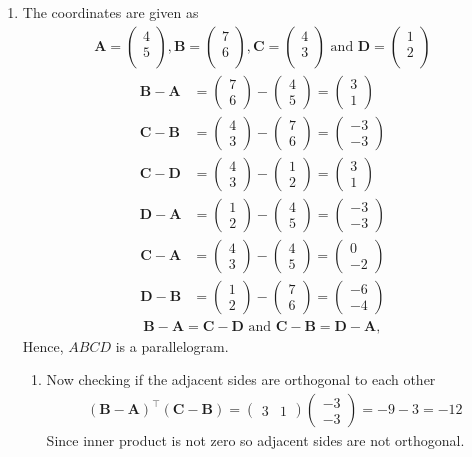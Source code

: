 \documentclass[12pt]{article}
\newcommand{\myvec}[1]{\ensuremath{\begin{pmatrix}#1\end{pmatrix}}}
\let\vec\mathbf
\begin{document}
\begin{enumerate}
\item The coordinates are given as
	\begin{align}
	\vec{A} = \myvec{
		4\\
		5\\
		},
	\vec{B} = \myvec{
		7\\
		6\\
		},
	\vec{C} = \myvec{
		4\\
		3\\
		} \text{ and }
	\vec{D} = \myvec{
		1\\
		2\\
		}
	\end{align}
	\begin{align}
		\vec{B} - \vec{A} &= \myvec{7\\6} - \myvec{4\\5} = \myvec{3\\1}\\
		\vec{C} - \vec{B} &= \myvec{4\\3} - \myvec{7\\6} = \myvec{-3\\-3}\\
		\vec{C} - \vec{D} &= \myvec{4\\3} - \myvec{1\\2} = \myvec{3\\1}\\
		\vec{D} - \vec{A} &= \myvec{1\\2} - \myvec{4\\5} = \myvec{-3\\-3}
	\end{align}
	\begin{align}
		\vec{C} - \vec{A} &= \myvec{4\\3} - \myvec{4\\5} = \myvec{0\\-2}\\
		\vec{D} - \vec{B} &= \myvec{1\\2} - \myvec{7\\6} = \myvec{-6\\-4}
	\end{align}
	\begin{align}
		\vec{B}-\vec{A} = \vec{C}-\vec{D} \text{ and } \vec{C}-\vec{B} = \vec{D}-\vec{A},
	\end{align}
	Hence, $ABCD$ is a parallelogram.
	\begin{enumerate}
		\item Now checking if the adjacent sides are orthogonal to each other
	\begin{align}
		(\vec{B}-\vec{A})^\top (\vec{C}-\vec{B}) = \myvec{3&1} \myvec{-3\\-3} = -9-3 = -12
	\end{align}
	Since inner product is not zero so adjacent sides are not orthogonal.


\end{enumerate}
\end{enumerate}
\end{document}
